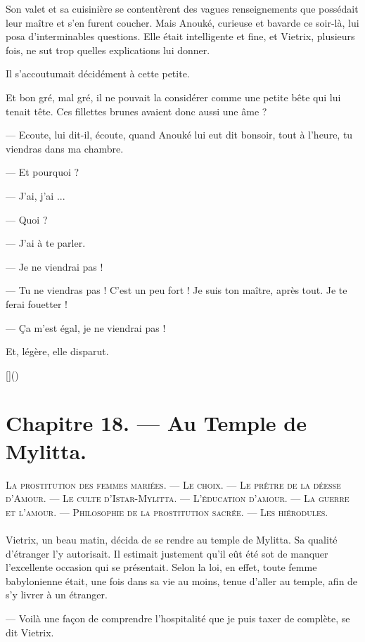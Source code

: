 \documentclass[a4paper, 11pt, oneside, polutonikogreek, french]{article}
\begin{document}
Son valet et sa cuisinière se contentèrent des vagues renseignements que possédait leur maître et s'en furent coucher. Mais Anouké, curieuse et bavarde ce soir-là, lui posa d'interminables questions. Elle était intelligente et fine, et Vietrix, plusieurs fois, ne sut trop quelles explications lui donner.

Il s'accoutumait décidément à cette petite.

Et bon gré, mal gré, il ne pouvait la considérer comme une petite bête qui lui tenait tête. Ces fillettes brunes avaient donc aussi une âme ?

--- Ecoute, lui dit-il, écoute, quand Anouké lui eut dit bonsoir, tout à l'heure, tu viendras dans ma chambre.

--- Et pourquoi ?

--- J'ai, j'ai ...

--- Quoi ?

--- J'ai à te parler.

--- Je ne viendrai pas !

--- Tu ne viendras pas ! C'est un peu fort ! Je suis ton maître, après tout. Je te ferai fouetter !

--- Ça m'est égal, je ne viendrai pas !

Et, légère, elle disparut.

[]()
\clearpage
\section{Chapitre 18. --- Au Temple de Mylitta.}
\begin{center}
\scshape
\small
La prostitution des femmes mariées. --- Le choix. --- Le prêtre de la déesse d'Amour. --- Le culte d'Istar-Mylitta. --- L'éducation d'amour. --- La guerre et l'amour. --- Philosophie de la prostitution sacrée. --- Les hiérodules.
\end{center}
\paragraph{}
Vietrix, un beau matin, décida de se rendre au temple de Mylitta. Sa qualité d'étranger l'y autorisait. Il estimait justement qu'il eût été sot de manquer l'excellente occasion qui se présentait. Selon la loi, en effet, toute femme babylonienne était, une fois dans sa vie au moins, tenue d'aller au temple, afin de s'y livrer à un étranger.

--- Voilà une façon de comprendre l'hospitalité que je puis taxer de complète, se dit Vietrix.
\end{document}
